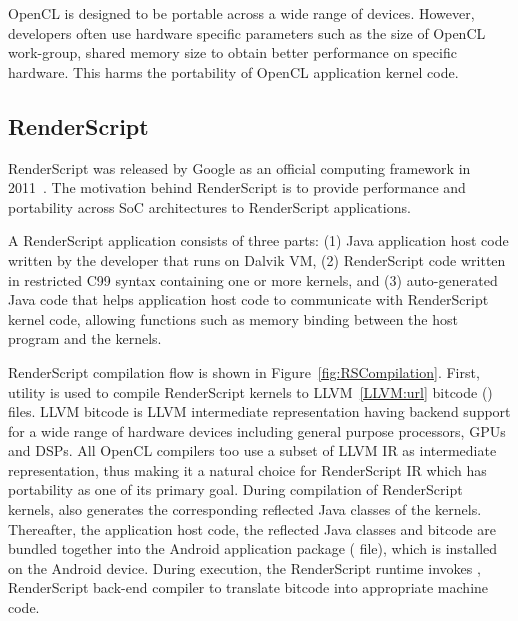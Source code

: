 OpenCL is designed to be portable across a wide range of devices. However,
developers often use hardware specific parameters such as the size of OpenCL
work-group, shared memory size to obtain better performance on specific
hardware. This harms the portability of OpenCL application kernel code.

\subsection{RenderScript}
RenderScript was released by Google as an official computing framework in
2011~\cite{RederScript:url}. The motivation behind RenderScript is to provide
performance and portability across SoC architectures to RenderScript
applications.

A RenderScript application consists of three parts: (1) Java application host
code written by the developer that runs on Dalvik VM, (2) RenderScript code
written in restricted C99 syntax containing one or more kernels, and (3)
auto-generated Java code that helps application host code to communicate with
RenderScript kernel code, allowing functions such as memory binding between the
host program and the kernels.

RenderScript compilation flow is shown in Figure~\ref{fig:RSCompilation}.
First,  utility is used to compile RenderScript kernels to
LLVM~\ref{LLVM:url} bitcode () files. LLVM bitcode is LLVM
intermediate representation having backend support for a wide range of hardware
devices including general purpose processors, GPUs and DSPs. All OpenCL
compilers too use a subset of LLVM IR as intermediate representation, thus
making it a natural choice for RenderScript IR which has portability as one of
its primary goal. During compilation of RenderScript kernels, 
also generates the corresponding reflected Java classes of the kernels.
Thereafter, the application host code, the reflected Java classes and bitcode
are bundled together into the Android application package ( file),
which is installed on the Android device. During execution, the RenderScript
runtime invokes , RenderScript back-end compiler to translate
bitcode into appropriate machine code.

